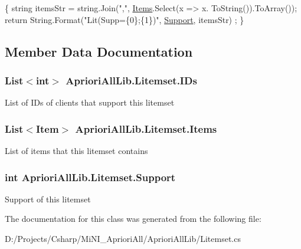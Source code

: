 \begin{DoxyCode}
                                          \{
            \textcolor{keywordtype}{string} itemsStr = \textcolor{keywordtype}{string}.Join(\textcolor{stringliteral}{","}, \hyperlink{class_apriori_all_lib_1_1_litemset_aef38d5fccb4e45867abf5838ab8a68fa}{Items}.Select(x => x.
      ToString()).ToArray());
            \textcolor{keywordflow}{return} String.Format(\textcolor{stringliteral}{"Lit(Supp=\{0\};\{1\})"}, \hyperlink{class_apriori_all_lib_1_1_litemset_a9f37ba3b3423bc7a1619493132dbc3e2}{Support}, itemsStr)
      ;
        \}
\end{DoxyCode}


\subsection{Member Data Documentation}
\hypertarget{class_apriori_all_lib_1_1_litemset_a74c9ee16b225268e66ee77d69142bc1a}{
\subsubsection[{I\-Ds}]{\setlength{\rightskip}{0pt plus 5cm}List$<$int$>$ Apriori\-All\-Lib.\-Litemset.\-I\-Ds}}\label{class_apriori_all_lib_1_1_litemset_a74c9ee16b225268e66ee77d69142bc1a}


List of I\-Ds of clients that support this litemset 

\hypertarget{class_apriori_all_lib_1_1_litemset_aef38d5fccb4e45867abf5838ab8a68fa}{
\subsubsection[{Items}]{\setlength{\rightskip}{0pt plus 5cm}List$<${\bf Item}$>$ Apriori\-All\-Lib.\-Litemset.\-Items}}\label{class_apriori_all_lib_1_1_litemset_aef38d5fccb4e45867abf5838ab8a68fa}


List of items that this litemset contains 

\hypertarget{class_apriori_all_lib_1_1_litemset_a9f37ba3b3423bc7a1619493132dbc3e2}{
\subsubsection[{Support}]{\setlength{\rightskip}{0pt plus 5cm}int Apriori\-All\-Lib.\-Litemset.\-Support}}\label{class_apriori_all_lib_1_1_litemset_a9f37ba3b3423bc7a1619493132dbc3e2}


Support of this litemset 



The documentation for this class was generated from the following file\-:\begin{DoxyCompactItemize}
\item 
D\-:/\-Projects/\-Csharp/\-Mi\-N\-I\-\_\-\-Apriori\-All/\-Apriori\-All\-Lib/Litemset.\-cs\end{DoxyCompactItemize}
